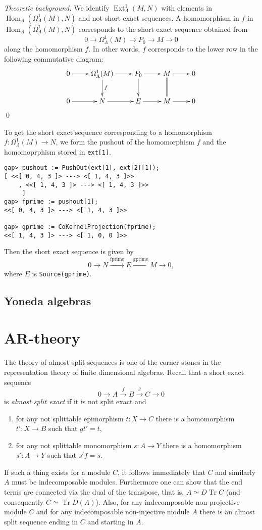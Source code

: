 \documentclass{amsart}
\newcommand{\Hom}{\operatorname{Hom}\nolimits}
\newcommand{\Tr}{\operatorname{Tr}\nolimits}
\newcommand{\Ext}{\operatorname{Ext}\nolimits}
\theoremstyle{definition}
\newcommand{\code}[1]{\texttt{#1}}
\theoremstyle{theoretic}
\newenvironment{theoback}
{\medskip\footnotesize\textit{Theoretic background.} }
{\qed\par\medskip}
\begin{document}
\begin{theoback}
We identify $\Ext^1_\Lambda(M,N)$ with elements in
$\Hom_\Lambda(\Omega^1_\Lambda(M),N)$ and not short exact sequences.
A homomorphism in $f$ in $\Hom_\Lambda(\Omega^1_\Lambda(M),N)$
corresponds to the short exact sequence obtained from 
\[0\to \Omega^1_\Lambda(M)\to P_0 \to M\to 0\]
along the homomorphism $f$.  In other words, $f$ corresponds to the
lower row in the following commutative diagram:
\[\xymatrix{
0\ar[r] & \Omega^1_\Lambda(M)\ar[r]\ar[d]^f & P_0\ar[r]\ar[d] &
M\ar[r]\ar@{=}[d] & 0\\
0\ar[r] & N \ar[r] & E\ar[r] & M\ar[r] & 0
}\]
\end{theoback}
To get the short exact sequence corresponding to a homomorphism
$f\colon \Omega^1_\Lambda(M)\to N$, we form the pushout of the
homomorphism $f$ and the homomoprphism stored in \code{ext[1]}. 
\begin{verbatim}
gap> pushout := PushOut(ext[1], ext[2][1]);
[ <<[ 0, 4, 3 ]> ---> <[ 1, 4, 3 ]>>
    , <<[ 1, 4, 3 ]> ---> <[ 1, 4, 3 ]>>
     ]
gap> fprime := pushout[1];     
<<[ 0, 4, 3 ]> ---> <[ 1, 4, 3 ]>>

gap> gprime := CoKernelProjection(fprime); 
<<[ 1, 4, 3 ]> ---> <[ 1, 0, 0 ]>>
\end{verbatim}
Then the short exact sequence is given by 
\[0\to N\xrightarrow{\textrm{fprime}} E\xrightarrow{\textrm{gprime}}
M\to 0,\]
where $E$ is \code{Source(gprime)}.  

\subsection{Yoneda algebras}

\section{AR-theory}
The theory of almost split sequences is one of the corner stones in
the representation theory of finite dimensional algebras.  Recall that
a short exact sequence 
\[0\to A\xrightarrow{f} B\xrightarrow{g} C\to 0\]
is \emph{almost split exact} if it is not split exact and 
\begin{enumerate}[\rm(i)]
\item for any not splittable epimorphism $t\colon X\to C$ there is a
  homomorphism $t'\colon X\to B$ such that $gt' = t$, 
\item for any not splittable monomorphism $s\colon A\to Y$ there is a
  homomorphism $s'\colon A\to Y$ such that $s'f = s$.
\end{enumerate}
If such a thing exists for a module $C$, it follows immediately that
$C$ and similarly $A$ must be indecomposable modules.  Furthermore one
can show that the end terms are connected via the dual of the
transpose, that is, $A\simeq D\Tr C$ (and consequently $C\simeq \Tr
D(A)$).  Also, for any indecomposable non-projective module $C$ and
for any indecomposable non-injective module $A$ there is an almost
split sequence ending in $C$ and starting in $A$.  
\end{document}

